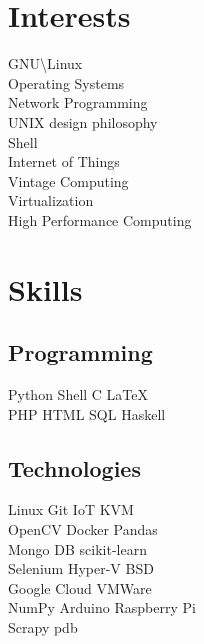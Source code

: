 \documentclass[]{resume_karuvally_openfont}
\begin{document}
\begin{minipage}[t]{0.33\textwidth}

\section{Interests}
GNU\textbackslash Linux \\
Operating Systems \\
Network Programming \\
UNIX design philosophy \\
Shell \\
Internet of Things \\
Vintage Computing \\
Virtualization \\
High Performance Computing
\sectionsep


\section{Skills}
\subsection{Programming}
Python \textbullet{} Shell \textbullet{} C \textbullet{} \LaTeX \\
PHP \textbullet{} HTML \textbullet{} SQL \textbullet{} Haskell 
\sectionsep

\subsection{Technologies}
Linux \textbullet{} Git \textbullet{} IoT \textbullet{} KVM \\
OpenCV \textbullet{} Docker \textbullet{} Pandas \\
Mongo DB \textbullet{} scikit-learn \\
Selenium \textbullet{} Hyper-V \textbullet{} BSD \\
Google Cloud \textbullet{} VMWare \\
NumPy \textbullet{} Arduino \textbullet{} Raspberry Pi \\
Scrapy \textbullet{} pdb
\sectionsep

%
%

\end{minipage} 
\end{document}
